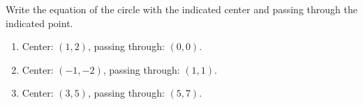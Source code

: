 Write the equation of the circle with the indicated center and passing through the indicated point.
\begin{enumerate}
\item Center: $(1,2)$, passing through: $(0,0)$.

\item Center: $(-1,-2)$, passing through: $(1,1)$.

\item Center: $(3,5)$, passing through: $(5,7)$.

\end{enumerate}